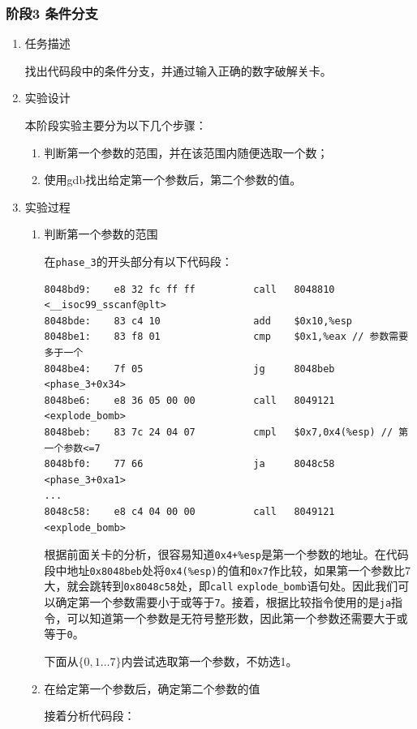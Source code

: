 \documentclass{paper}
\begin{document}
\subsubsection{阶段3 条件分支}
\begin{enumerate}
\item 任务描述

找出代码段中的条件分支，并通过输入正确的数字破解关卡。

\item 实验设计

本阶段实验主要分为以下几个步骤：
\begin{enumerate}
\item 判断第一个参数的范围，并在该范围内随便选取一个数；
\item 使用gdb找出给定第一个参数后，第二个参数的值。
\end{enumerate}

\item 实验过程

\begin{enumerate}
\item 判断第一个参数的范围

在\verb|phase_3|的开头部分有以下代码段：
\begin{lstlisting}
8048bd9:	e8 32 fc ff ff       	call   8048810 <__isoc99_sscanf@plt>
8048bde:	83 c4 10             	add    $0x10,%esp
8048be1:	83 f8 01             	cmp    $0x1,%eax // 参数需要多于一个
8048be4:	7f 05                	jg     8048beb <phase_3+0x34>
8048be6:	e8 36 05 00 00       	call   8049121 <explode_bomb>
8048beb:	83 7c 24 04 07       	cmpl   $0x7,0x4(%esp) // 第一个参数<=7
8048bf0:	77 66                	ja     8048c58 <phase_3+0xa1>
...
8048c58:	e8 c4 04 00 00       	call   8049121 <explode_bomb>
\end{lstlisting}

根据前面关卡的分析，很容易知道\verb|0x4+%esp|是第一个参数的地址。在代码段中地址\verb|0x8048beb|处将\verb|0x4(%esp)|的值和\verb|0x7|作比较，如果第一个参数比7大，就会跳转到\verb|0x8048c58|处，即\verb|call| \verb|explode_bomb|语句处。因此我们可以确定第一个参数需要小于或等于\verb|7|。接着，根据比较指令使用的是\verb|ja|指令，可以知道第一个参数是无符号整形数，因此第一个参数还需要大于或等于\verb|0|。

下面从$\{0, 1\dots7\}$内尝试选取第一个参数，不妨选1。

\item 在给定第一个参数后，确定第二个参数的值

接着分析代码段：


\end{enumerate}
\end{enumerate}
\end{document}
